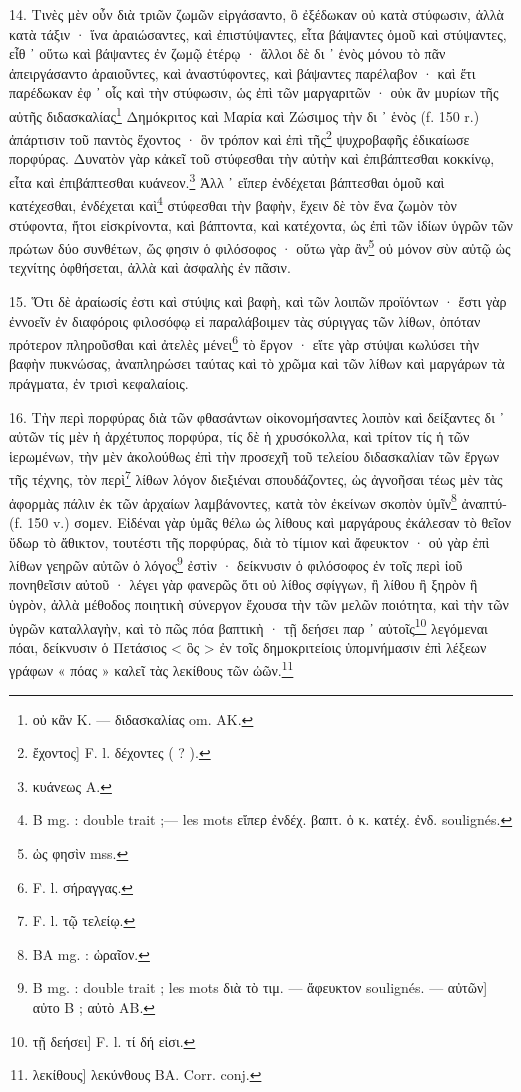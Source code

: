 \documentclass[a4paper, 11pt, oneside, polutonikogreek, french]{article}
\begin{document}
14. Τινὲς μὲν οὖν διὰ τριῶν ζωμῶν εἰργάσαντο, ὃ ἐξέδωκαν οὐ κατὰ στύφωσιν, ἀλλὰ κατὰ τάξιν · ἵνα ἀραιώσαντες, καὶ ἐπιστύψαντες, εἶτα βάψαντες ὁμοῦ καὶ στύψαντες, εἶθ ᾽ οὕτω καὶ βάψαντες ἐν ζωμῷ ἑτέρῳ · ἄλλοι δὲ δι ᾽ ἑνὸς μόνου τὸ πᾶν ἀπειργάσαντο ἀραιοῦντες, καὶ ἀναστύφοντες, καὶ βάψαντες παρέλαβον · καὶ ἔτι παρέδωκαν ἐφ ᾽ οἷς καὶ τὴν στύφωσιν, ὡς ἐπὶ τῶν μαργαριτῶν · οὐκ ἂν μυρίων τῆς αὐτῆς διδασκαλίας\footnote{οὐ κἂν K. --- διδασκαλίας om. AK.} Δημόκριτος καὶ Μαρία καὶ Ζώσιμος τὴν δι ᾽ ἑνὸς (f. 150 r.) ἀπάρτισιν τοῦ παντὸς ἔχοντος · ὃν τρόπον καὶ ἐπὶ τῆς\footnote{ἔχοντος] F. l. δέχοντες ( ? ).} ψυχροβαφῆς ἐδικαίωσε πορφύρας. Δυνατὸν γὰρ κἀκεῖ τοῦ στύφεσθαι τὴν αὐτὴν καὶ ἐπιβάπτεσθαι κοκκίνῳ, εἶτα καὶ ἐπιβάπτεσθαι κυάνεον.\footnote{κυάνεως A.} Ἀλλ ᾽ εἴπερ ἐνδέχεται βάπτεσθαι ὁμοῦ καὶ κατέχεσθαι, ἐνδέχεται καὶ\footnote{B mg. : double trait ;--- les mots εἴπερ ἐνδέχ. βαπτ. ὁ κ. κατέχ. ἐνδ. soulignés.} στύφεσθαι τὴν βαφὴν, ἔχειν δὲ τὸν ἕνα ζωμὸν τὸν στύφοντα, ἤτοι εἰσκρίνοντα, καὶ βάπτοντα, καὶ κατέχοντα, ὡς ἐπὶ τῶν ἰδίων ὑγρῶν τῶν πρώτων δύο συνθέτων, ὥς φησιν ὁ φιλόσοφος · οὕτω γὰρ ἂν\footnote{ὡς φησὶν mss.} οὐ μόνον σὺν αὐτῷ ὡς τεχνίτης ὀφθήσεται, ἀλλὰ καὶ ἀσφαλὴς ἐν πᾶσιν.

15. Ὅτι δὲ ἀραίωσίς ἐστι καὶ στύψις καὶ βαφὴ, καὶ τῶν λοιπῶν προϊόντων · ἔστι γὰρ ἐννοεῖν ἐν διαφόροις φιλοσόφῳ εἰ παραλάβοιμεν τὰς σύριγγας τῶν λίθων, ὀπόταν πρότερον πληροῦσθαι καὶ ἀτελὲς μένει\footnote{F. l. σήραγγας.} τὸ ἔργον · εἴτε γὰρ στύψαι κωλύσει τὴν βαφὴν πυκνώσας, ἀναπληρώσει ταύτας καὶ τὸ χρῶμα καὶ τῶν λίθων καὶ μαργάρων τὰ πράγματα, ἐν τρισὶ κεφαλαίοις.

16. Τὴν περὶ πορφύρας διὰ τῶν φθασάντων οἰκονομήσαντες λοιπὸν καὶ δείξαντες δι ᾽ αὐτῶν τίς μὲν ἡ ἀρχέτυπος πορφύρα, τίς δὲ ἡ χρυσόκολλα, καὶ τρίτον τίς ἡ τῶν ἱερωμένων, τὴν μὲν ἀκολούθως ἐπὶ τὴν προσεχῆ τοῦ τελείου διδασκαλίαν τῶν ἔργων τῆς τέχνης, τὸν περὶ\footnote{F. l. τῷ τελείῳ.} λίθων λόγον διεξιέναι σπουδάζοντες, ὠς ἀγνοῆσαι τέως μὲν τὰς ἀφορμὰς πάλιν ἐκ τῶν ἀρχαίων λαμβάνοντες, κατὰ τὸν ἐκείνων σκοπὸν ὑμῖν\footnote{BA mg. : ὡραῖον.} ἀναπτύ- (f. 150 v.) σομεν. Εἰδέναι γὰρ ὑμᾶς θέλω ὡς λίθους καὶ μαργάρους ἐκάλεσαν τὸ θεῖον ὕδωρ τὸ ἄθικτον, τουτέστι τῆς πορφύρας, διὰ τὸ τίμιον καὶ ἄφευκτον · οὐ γὰρ ἐπὶ λίθων γεηρῶν αὐτῶν ὁ λόγος\footnote{B mg. : double trait ; les mots διὰ τὸ τιμ. --- ἄφευκτον soulignés. --- αὐτῶν] αὐτο B ; αὐτὸ AB.} ἐστὶν · δείκνυσιν ὁ φιλόσοφος ἐν τοῖς περὶ ἰοῦ πονηθεῖσιν αὐτοῦ · λέγει γὰρ φανερῶς ὅτι οὐ λίθος σφίγγων, ἢ λίθου ἢ ξηρὸν ἢ ὑγρὸν, ἀλλὰ μέθοδος ποιητικὴ σύνεργον ἔχουσα τὴν τῶν μελῶν ποιότητα, καὶ τὴν τῶν ὑγρῶν καταλλαγὴν, καὶ τὸ πῶς πόα βαπτικὴ · τῇ δεήσει παρ ᾽ αὐτοῖς\footnote{τῇ δεήσει] F. l. τί δή εἰσι.} λεγόμεναι πόαι, δείκνυσιν ὁ Πετάσιος < ὃς > ἐν τοῖς δημοκριτείοις ὑπομνήμασιν ἐπὶ λέξεων γράφων « πόας » καλεῖ τὰς λεκίθους τῶν ὠῶν.\footnote{λεκίθους] λεκύνθους BA. Corr. conj.}
\end{document}
